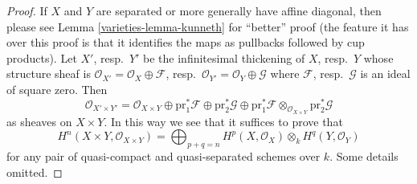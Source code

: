 \begin{proof}

If $X$ and $Y$ are separated or more generally have affine diagonal, then
please see Lemma \ref{varieties-lemma-kunneth} for ``better'' proof
(the feature it has over this proof is that it identifies the
maps as pullbacks followed by cup products).
Let $X'$, resp.\ $Y'$ be the infinitesimal thickening of $X$, resp.\ $Y$
whose structure sheaf is
$\mathcal{O}_{X'} = \mathcal{O}_X \oplus \mathcal{F}$,
resp.\ $\mathcal{O}_{Y'} = \mathcal{O}_Y \oplus \mathcal{G}$ where
$\mathcal{F}$, resp.\ $\mathcal{G}$ is an ideal of square zero.
Then
$$
\mathcal{O}_{X' \times Y'} =
\mathcal{O}_{X \times Y}
\oplus \text{pr}_1^*\mathcal{F}
\oplus \text{pr}_2^*\mathcal{G}
\oplus \text{pr}_1^*\mathcal{F}
\otimes_{\mathcal{O}_{X \times Y}} \text{pr}_2^*\mathcal{G}
$$
as sheaves on $X \times Y$. In this way we see that it suffices to
prove that
$$
H^n(X \times Y, \mathcal{O}_{X \times Y}) =
\bigoplus\nolimits_{p + q = n}
H^p(X, \mathcal{O}_X) \otimes_k H^q(Y, \mathcal{O}_Y)
$$
for any pair of quasi-compact and quasi-separated schemes over $k$.
Some details omitted.


\end{proof}
